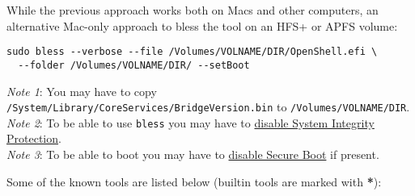 \documentclass[]{article}
\begin{document}
While the previous approach works both on Macs and other computers,
an alternative Mac-only approach to bless the tool on an HFS+ or APFS
volume:

\begin{lstlisting}[caption=Blessing tool, label=blesstool, style=ocbash]
sudo bless --verbose --file /Volumes/VOLNAME/DIR/OpenShell.efi \
  --folder /Volumes/VOLNAME/DIR/ --setBoot
\end{lstlisting}

\emph{Note 1}: You may have to copy \texttt{/System/Library/CoreServices/BridgeVersion.bin}
  to \texttt{/Volumes/VOLNAME/DIR}. \\
\emph{Note 2}: To be able to use \texttt{bless} you may have to
  \href{https://developer.apple.com/library/archive/documentation/Security/Conceptual/System_Integrity_Protection_Guide/ConfiguringSystemIntegrityProtection/ConfiguringSystemIntegrityProtection.html}{disable System Integrity Protection}. \\
\emph{Note 3}: To be able to boot you may have to \href{https://support.apple.com/HT208330}{disable Secure Boot}
  if present.

Some of the known tools are listed below (builtin tools are marked with \textbf{*}):
\end{document}
